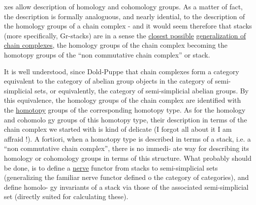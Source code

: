 
xes allow description of homology and cohomology groups.  As a matter of
fact,  the description is formally analoguous,  and nearly idential, to
the description of the homology groups of a chain complex  -  and it
would seem therefore that stacks (more specifically,  Gr-stacks) are
in a sense the \uline{closest possible}  \uline{generalization of}  \uline{chain complexes},
the homology groups of the chain complex becoming the homotopy groups
of the ``non commutative chain complex'' or stack.

It is well understood,  since Dold-Puppe that chain complexes
form a category equivalent to the category of abelian group objects in
the category of semi-simplicial sets,  or equivalently,  the category of
semi-simplicial abelian groups.  By this equivalence,  the homology
groups of the chain complex are identified with the \uline{homotopy} groups of
the corresponding homotopy type.  As for the  homology and cohomolo%
\hand{-}gy groups of this homotopy type,  their description in terms of the
chain complex we started with is kind of delicate (I forgot all about it
I am affraid !).  A fortiori, when a homotopy type is described in terms
of a stack,  i.e. a ``non commutative chain complex'',  there is no immedi-%
ate way for describing its homology or cohomology groups  in terms of
this structure\hand{(*)}. What probably should be done,  is to define  a \uline{nerve}
functor  from stacks to semi-simplicial sets  (generalizing the familiar
nerve functor defined o the category of categories),  and define homolo-%
gy invariants of a stack via those of the associated semi-simplicial set
(directly suited for calculating these).

